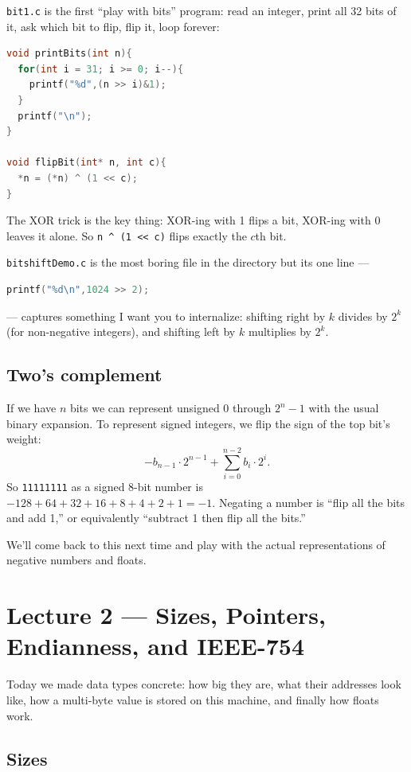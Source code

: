 \documentclass[11pt]{article}
\begin{document}
\texttt{bit1.c} is the first ``play with bits'' program: read an
integer, print all 32 bits of it, ask which bit to flip, flip it,
loop forever:

\begin{lstlisting}[language=C]
void printBits(int n){
  for(int i = 31; i >= 0; i--){
    printf("%d",(n >> i)&1);
  }
  printf("\n");
}

void flipBit(int* n, int c){
  *n = (*n) ^ (1 << c);
}
\end{lstlisting}

The XOR trick is the key thing: XOR-ing with 1 flips a bit, XOR-ing
with 0 leaves it alone. So \texttt{n \^{} (1 << c)} flips exactly the
$c$th bit.

\texttt{bitshiftDemo.c} is the most boring file in the directory but
its one line ---
\begin{lstlisting}[language=C]
printf("%d\n",1024 >> 2);
\end{lstlisting}
--- captures something I want you to internalize: shifting right by
$k$ divides by $2^k$ (for non-negative integers), and shifting left
by $k$ multiplies by $2^k$.

\subsection*{Two's complement}

If we have $n$ bits we can represent unsigned $0$ through $2^n - 1$
with the usual binary expansion. To represent signed integers,
we flip the sign of the top bit's weight:
\[
  -b_{n-1} \cdot 2^{n-1} + \sum_{i=0}^{n-2} b_i \cdot 2^i.
\]
So \texttt{11111111} as a signed 8-bit number is
$-128 + 64 + 32 + 16 + 8 + 4 + 2 + 1 = -1$. Negating a number is
``flip all the bits and add 1,'' or equivalently ``subtract 1 then
flip all the bits.''

We'll come back to this next time and play with the actual
representations of negative numbers and floats.

\section{Lecture 2 --- Sizes, Pointers, Endianness, and IEEE-754}

Today we made data types concrete: how big they are, what their
addresses look like, how a multi-byte value is stored on this
machine, and finally how floats work.

\subsection*{Sizes}
\end{document}
